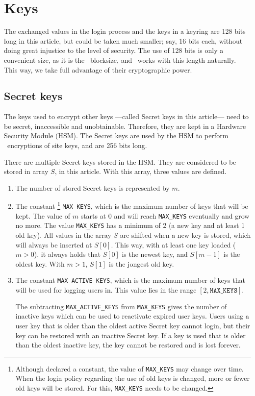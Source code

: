 \section{Keys}
The exchanged values in the login process and the keys in a keyring are 128 bits long in this article,
but could be taken much smaller;
say,
16 bits each,
without doing great injustice to the level of security.
The use of 128 bits is only a convenient size,
as it is the \AES\ blocksize, and \SHA\ works with this length naturally.
This way,
we take full advantage of their cryptographic power.

\subsection{Secret keys}
\label{sec:secret_keys}
The keys used to encrypt other keys%
---called Secret keys in this article---%
need to be secret, inaccessible and unobtainable.
Therefore, they are kept in a Hardware Security Module (HSM).
The Secret keys are used by the HSM to perform \AES\ encryptions of site keys, and are 256 bits long.
\par
There are multiple Secret keys stored in the HSM.
They are considered to be stored in array $S$, in this article.
With this array, three values are defined.
\begin{enumerate}
\item	The number of stored Secret keys is represented by $m$.
\item	The constant%
\footnote{Although declared a constant, the value of \texttt{MAX\_KEYS} may change over time.
When the login policy regarding the use of old keys is changed, more or fewer old keys will be stored.
For this, \texttt{MAX\_KEYS} needs to be changed.}
\texttt{MAX\_KEYS}, which is the maximum number of keys that will be kept.
The value of $m$ starts at 0 and will reach \texttt{MAX\_KEYS} eventually and grow no more.
The value \texttt{MAX\_KEYS} has a minimum of 2 (a new key and at least 1 old key).
All values in the array $S$ are shifted when a new key is stored, which will always be inserted at $S[0]$.
This way, with at least one key loaded ($m>0$), it always holds that $S[0]$ is the newest key,
and $S[m-1]$ is the oldest key.
With $m>1$, $S[1]$ is the jongest old key.
\item	The constant \texttt{MAX\_ACTIVE\_KEYS},
which is the maximum number of keys that will be used for logging users in.
This value lies in the range $[2, \mathtt{MAX\_KEYS}]$.
\par
The subtracting \texttt{MAX\_ACTIVE\_KEYS} from \texttt{MAX\_KEYS}
gives the number of inactive keys which can be used to reactivate expired user keys.
Users using a user key that is older than the oldest active Secret key cannot login,
but their key can be restored with an inactive Secret key.
If a key is used that is older than the oldest inactive key,
the key cannot be restored and is lost forever.
\end{enumerate}


